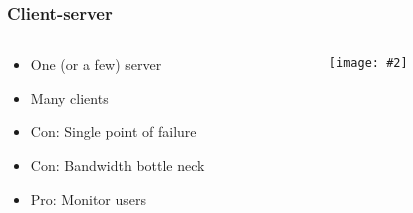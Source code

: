 \documentclass[mathserif,serif,14pt,aspectratio=169]{beamer}
\newcommand{\pic}[2]{
	\centerline{\texttt{[image: \#2]}}
}
\begin{document}
\begin{frame}
	\frametitle{Client-server}
	\begin{columns}
		\begin{column}{0.5\textwidth}
			\begin{itemize}\setlength\itemsep{0.5em}
				\item<2-> One (or a few) server
				\item<2-> Many clients
				\item<3-> Con: Single point of failure
				\item<4-> Con: Bandwidth bottle neck
				\item<5-> Pro: Monitor users
			\end{itemize}
		\end{column}
		\begin{column}{0.5\textwidth}
			\pic{0.65, trim={2cm 10.2cm 9cm 2cm}, clip}{assets/cn114.pdf}
			\nocite{01_KuroseJamesF2013Cn:a}
		\end{column}
	\end{columns}
\end{frame}
\end{document}
